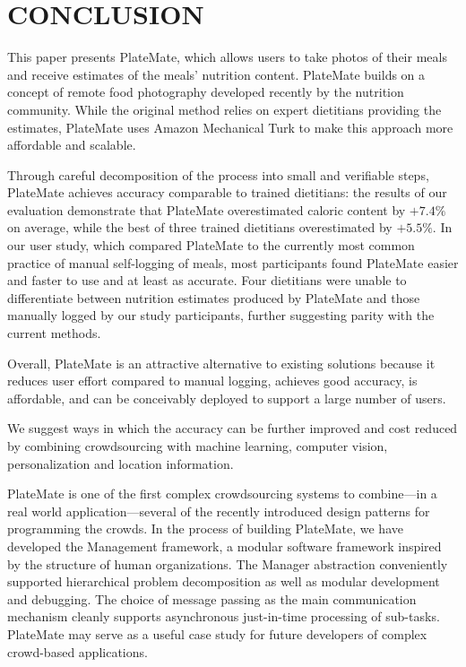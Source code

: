 \section{CONCLUSION}

This paper presents PlateMate, which allows users to take photos of their meals and receive estimates of the meals' nutrition content.  PlateMate builds on a concept of remote food photography developed recently by the nutrition community.  While the original method relies on expert dietitians providing the estimates, PlateMate uses Amazon Mechanical Turk to make this approach more affordable and scalable.  

Through careful decomposition of the process into small and verifiable steps, PlateMate achieves accuracy comparable to trained dietitians:  
the results of our evaluation demonstrate that PlateMate overestimated caloric content by $+7.4\%$ on average, while the best of three trained dietitians overestimated by $+5.5\%$.  In our user study, which compared PlateMate to the currently most common practice of manual self-logging of meals, most participants found PlateMate easier and faster to use and at least as accurate.  Four dietitians were unable to differentiate between nutrition estimates produced by PlateMate and those manually logged by our study participants, further suggesting parity with the current methods.

Overall, PlateMate is an attractive alternative to existing solutions because it reduces user effort compared to manual logging, achieves good accuracy, is affordable, and can be conceivably deployed to support a large number of users.

We suggest ways in which the accuracy can be further improved and cost reduced by combining crowdsourcing with machine learning, computer vision, personalization and location information. 

PlateMate is one of the first complex crowdsourcing systems to combine---in a real world application---several of the recently introduced design patterns for programming the crowds.  In the process of building PlateMate, we have developed the Management framework, a modular software framework inspired by the structure of human organizations.  The Manager abstraction conveniently supported hierarchical problem decomposition as well as modular development and debugging.  The choice of message passing as the main communication mechanism cleanly supports asynchronous just-in-time processing of sub-tasks.  PlateMate may serve as a useful case study for future developers of complex crowd-based applications.


